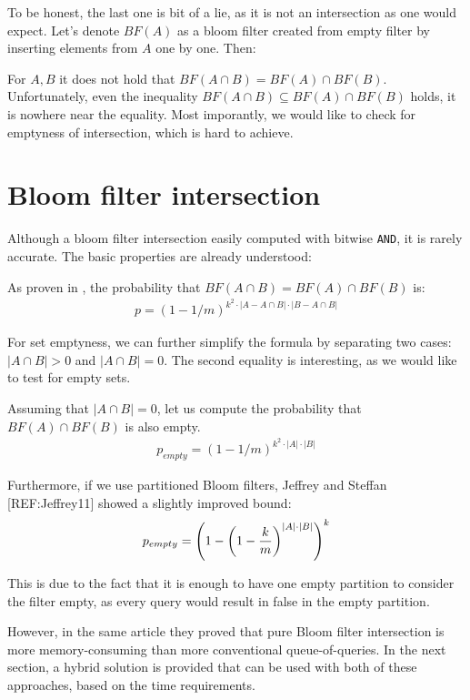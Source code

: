 To be honest, the last one is bit of a lie, as it is not an intersection as one
would expect. Let's denote $BF(A)$ as a bloom filter created from empty filter
by inserting elements from $A$ one by one. Then:

For $A,B$ it does not hold that $BF(A \cap B) = BF(A) \cap
BF(B)$. Unfortunately, even the inequality $BF(A \cap B) \subseteq BF(A) \cap
BF(B)$ holds, it is nowhere near the equality. Most imporantly, we would like to
check for emptyness of intersection, which is hard to achieve.

\section{Bloom filter intersection}

Although a bloom filter intersection easily computed with bitwise {\tt AND},
it is rarely accurate. The basic properties are already understood:

As proven in \cite{bose2008false}, the probability that $BF(A\cap B) =
BF(A) \cap BF(B)$ is:
\begin{align}
p = (1-1/m)^{k^2\cdot |A-A\cap B| \cdot |B - A\cap B|}
\end{align}

For set emptyness, we can further simplify the formula by separating two cases:
$|A \cap B| > 0$ and $|A \cap B| = 0$. The second equality is interesting, as
we would like to test for empty sets.

Assuming that $|A\cap B| = 0$, let us compute the probability that $BF(A) \cap
BF(B)$ is also empty.
\begin{align}
	p_{empty} = (1-1/m)^{k^2 \cdot |A| \cdot |B|}
\end{align}

Furthermore, if we use partitioned Bloom filters, Jeffrey and Steffan
[REF:Jeffrey11] showed a slightly improved bound:
\begin{align}
	p_{empty} = \left(1 - \left( 1 - {k \over m}\right)^{|A|\cdot |B|}\right)^k
\end{align}

This is due to the fact that it is enough to have one empty partition to consider
the filter empty, as every query would result in false in the empty partition.

However, in the same article they proved that pure Bloom filter intersection is more
memory-consuming than more conventional queue-of-queries. In the next section,
a hybrid solution is provided that can be used with both of these approaches,
based on the time requirements.

